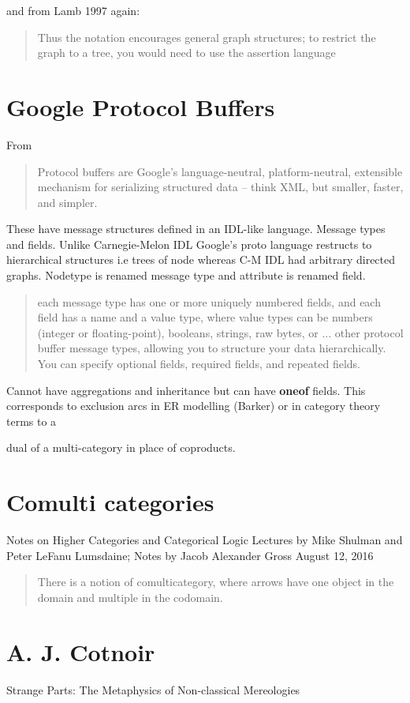 \documentclass[11pt,a4paper]{scrartcl}
\begin{document}
and from Lamb 1997 again:
\begin{quote}
Thus the notation encourages general graph structures; to restrict the graph to a tree, you
would need to use the assertion language
\end{quote}

\section{Google Protocol Buffers}
From 
\begin{quote}
Protocol buffers are Google's language-neutral, platform-neutral, extensible mechanism for serializing structured data – think XML, but smaller, faster, and simpler. 
\end{quote}

These have message structures defined in an IDL-like language. Message types and fields. Unlike Carnegie-Melon IDL Google's proto language restructs to
hierarchical structures i.e trees of node whereas C-M IDL had arbitrary directed graphs. Nodetype is renamed message type and attribute is renamed field.

\begin{quote}
each message type has one or more uniquely numbered fields, and each field has a name and a value type, where value types can be numbers (integer or floating-point), booleans, strings, raw bytes, or ... other protocol buffer message types, allowing you to structure your data hierarchically. You can specify optional fields, required fields, and repeated fields.
\end{quote}
Cannot have aggregations and inheritance but can have \textbf{oneof} fields. This corresponds to exclusion arcs in ER modelling (Barker) or in category theory terms to a 

dual of a multi-category in place of coproducts. 

\section{Comulti categories}
Notes on Higher Categories and Categorical Logic
Lectures by Mike Shulman and Peter LeFanu Lumsdaine;
Notes by Jacob Alexander Gross
August 12, 2016
\begin{quote}
There is a notion of comulticategory, where
arrows have one object in the domain and multiple in the codomain. 
\end{quote}

\section{A. J. Cotnoir}
Strange Parts: The Metaphysics of Non-classical Mereologies
\end{document}
